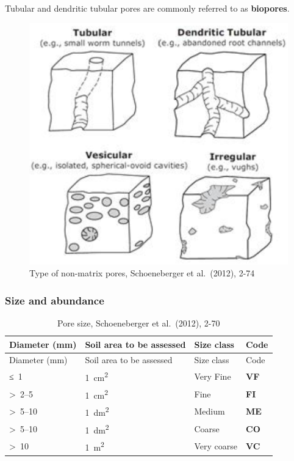 \documentclass[
  letterpaper,
  DIV=11,
  numbers=noendperiod]{scrreprt}
\begin{document}
Tubular and dendritic tubular pores are commonly referred to as
\textbf{biopores}.

\begin{figure}

{\centering \includegraphics{./figure_8-16.png}

}

\caption{Type of non-matrix pores, Schoeneberger et al.~(2012), 2-74}

\end{figure}

\hypertarget{size-and-abundance}{%
\subsubsection{Size and abundance}\label{size-and-abundance}}

\begin{longtable}[]{@{}llll@{}}
\caption{Pore size, Schoeneberger et al.~(2012), 2-70}\tabularnewline
\toprule()
Diameter (mm) & Soil area to be assessed & Size class & Code \\
\midrule()
\endfirsthead
\toprule()
Diameter (mm) & Soil area to be assessed & Size class & Code \\
\midrule()
\endhead
≤~1 & 1~cm\textsuperscript{2} & Very Fine & \textbf{VF} \\
\textgreater~2--5 & 1~cm\textsuperscript{2} & Fine & \textbf{FI} \\
\textgreater~5--10 & 1~dm\textsuperscript{2} & Medium & \textbf{ME} \\
\textgreater~5--10 & 1~dm\textsuperscript{2} & Coarse & \textbf{CO} \\
\textgreater~10 & 1~m\textsuperscript{2} & Very coarse & \textbf{VC} \\
\bottomrule()
\end{longtable}
\end{document}
